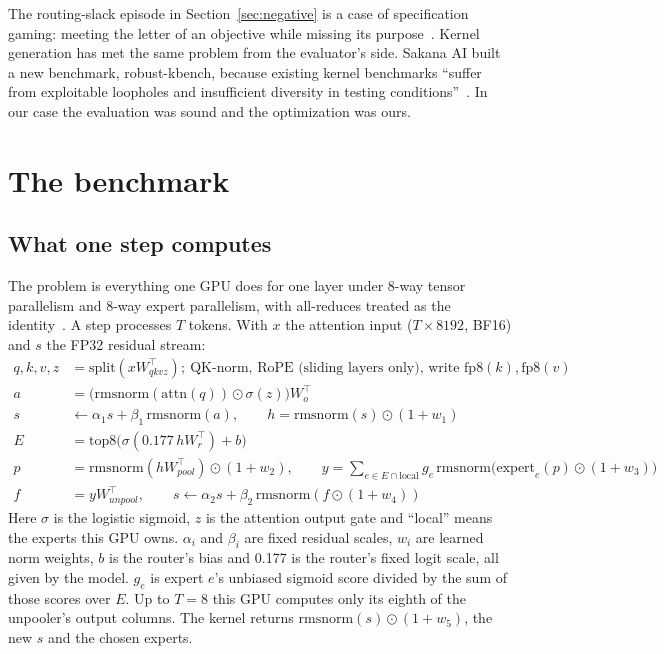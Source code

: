 \documentclass[11pt]{article}
\begin{document}
The routing-slack episode in Section~\ref{sec:negative} is a case of specification
gaming: meeting the letter of an objective while missing its purpose~\cite{specgaming}.
Kernel generation has met the same problem from the evaluator's side. Sakana AI
built a new benchmark, robust-kbench, because existing kernel benchmarks ``suffer
from exploitable loopholes and insufficient diversity in testing
conditions''~\cite{sakana}. In our case the evaluation was sound and the
optimization was ours.

\section{The benchmark}
\label{sec:benchmark}

\subsection{What one step computes}

The problem is everything one GPU does for one layer under 8-way tensor
parallelism and 8-way expert parallelism, with all-reduces treated as the
identity~\cite{task}. A step processes $T$ tokens. With $x$ the attention input
($T\times8192$, BF16) and $s$ the FP32 residual stream:
\begin{align*}
q,k,v,z &= \mathrm{split}(x W_{qkvz}^\top);\ \text{QK-norm, RoPE (sliding layers only), write } \mathrm{fp8}(k), \mathrm{fp8}(v)\\
a &= \bigl(\mathrm{rmsnorm}(\mathrm{attn}(q)) \odot \sigma(z)\bigr) W_o^\top\\
s &\leftarrow \alpha_1 s + \beta_1\,\mathrm{rmsnorm}(a),\qquad h = \mathrm{rmsnorm}(s)\odot(1+w_1)\\
E &= \mathrm{top8}\bigl(\sigma(0.177\, h W_r^\top) + b\bigr)\\
p &= \mathrm{rmsnorm}(h W_{pool}^\top)\odot(1+w_2),\qquad
y = \textstyle\sum_{e\in E\cap\text{local}} g_e\,\mathrm{rmsnorm}\bigl(\mathrm{expert}_e(p)\odot(1+w_3)\bigr)\\
f &= y W_{unpool}^\top,\qquad s \leftarrow \alpha_2 s + \beta_2\,\mathrm{rmsnorm}(f\odot(1+w_4))
\end{align*}
Here $\sigma$ is the logistic sigmoid, $z$ is the attention output gate and
``local'' means the experts this GPU owns. $\alpha_i$ and $\beta_i$ are fixed
residual scales, $w_i$ are learned norm
weights, $b$ is the router's bias and 0.177 is the router's fixed logit scale,
all given by the model. $g_e$ is expert $e$'s unbiased sigmoid score divided by
the sum of those scores over $E$. Up to $T=8$ this GPU computes only its eighth of
the unpooler's output columns. The kernel returns $\mathrm{rmsnorm}(s)\odot(1+w_5)$,
the new $s$ and the chosen experts.
\end{document}
